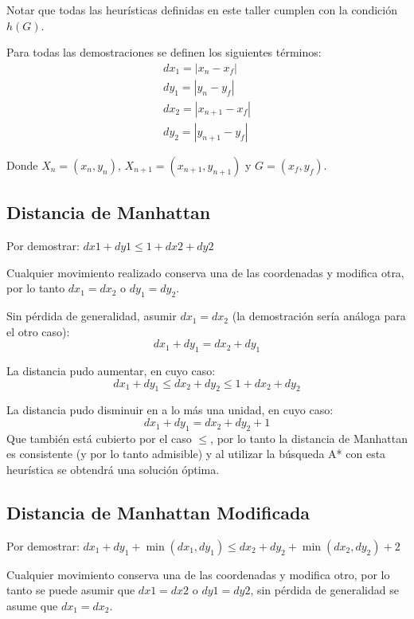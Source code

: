 \documentclass[letter, titlepage, 10pt]{article}
\newcommand{\abs}[1]{\left\vert#1\right\vert}
\begin{document}
\begin{appendices}
Notar que todas las heurísticas definidas en este taller cumplen con la condición $h(G)$.

Para todas las demostraciones se definen los siguientes términos:
\begin{align}
    dx_1 = \abs{x_n-x_f}\\
  dy_1 = \abs{y_n-y_f}\\
  dx_2 = \abs{x_{n+1}-x_f}\\
  dy_2 = \abs{y_{n+1}-y_f}
\end{align}

Donde $X_n = (x_n,y_n)$, $X_{n+1} = (x_{n+1},y_{n+1})$ y $G = (x_f,y_f)$. 

\subsection{Distancia de Manhattan}

Por demostrar: $dx1 + dy1 \leq 1 + dx2 + dy2$

Cualquier movimiento realizado conserva una de las coordenadas y modifica otra, por lo tanto $dx_1 = dx_2$ o $dy_1 = dy_2$.

Sin pérdida de generalidad, asumir $dx_1 = dx_2$ (la demostración sería análoga para el otro caso):
\begin{displaymath}
  dx_1 + dy_1 = dx_2 + dy_1
\end{displaymath}

La distancia pudo aumentar, en cuyo caso:
\begin{displaymath}
dx_1 + dy_1 \leq dx_2 + dy_2 \leq 1 + dx_2 + dy_2
\end{displaymath}

La distancia pudo disminuir en a lo más una unidad, en cuyo caso:
\begin{displaymath}
dx_1 +dy_1 = dx_2 + dy_2 + 1
\end{displaymath}
Que también está cubierto por el caso $\leq$, por lo tanto la distancia de Manhattan es consistente (y por lo tanto admisible) y al utilizar la búsqueda A* con esta heurística se obtendrá una solución óptima.

\subsection{Distancia de Manhattan Modificada}
Por demostrar: $dx_1 + dy_1 + \min{(dx_1,dy_1)} \leq dx_2 + dy_2 + \min{(dx_2,dy_2)} + 2$

Cualquier movimiento conserva una de las coordenadas y modifica otro, por lo tanto se puede asumir que $dx1 = dx2$ o $dy1 = dy2$, sin pérdida de generalidad se asume que $dx_1 = dx_2$.


\end{appendices}
\end{document}
